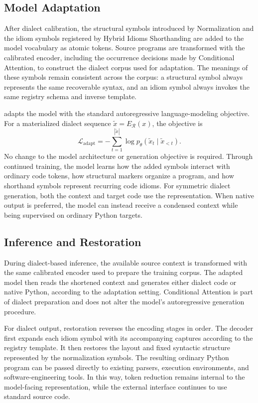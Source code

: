 \subsection{Model Adaptation}

After dialect calibration, the structural symbols introduced by Normalization and the idiom symbols registered by Hybrid Idioms Shorthanding are added to the model vocabulary as atomic tokens. Source programs are transformed with the calibrated encoder, including the occurrence decisions made by Conditional Attention, to construct the dialect corpus used for adaptation. The meanings of these symbols remain consistent across the corpus: a structural symbol always represents the same recoverable syntax, and an idiom symbol always invokes the same registry schema and inverse template.

\tool adapts the model with the standard autoregressive language-modeling objective. For a materialized dialect sequence $\widetilde{x}=E_{\mathcal{R}}(x)$, the objective is
\begin{equation}
    \mathcal{L}_{\mathrm{adapt}}
    =-\sum_{t=1}^{|\widetilde{x}|}
    \log p_{\theta}(\widetilde{x}_t\mid \widetilde{x}_{<t}).
\end{equation}
No change to the model architecture or generation objective is required. Through continued training, the model learns how the added symbols interact with ordinary code tokens, how structural markers organize a program, and how shorthand symbols represent recurring code idioms. For symmetric dialect generation, both the context and target code use the \tool representation. When native output is preferred, the model can instead receive a condensed context while being supervised on ordinary Python targets.

\subsection{Inference and Restoration}

During dialect-based inference, the available source context is transformed with the same calibrated encoder used to prepare the training corpus. The adapted model then reads the shortened context and generates either \tool dialect code or native Python, according to the adaptation setting. Conditional Attention is part of dialect preparation and does not alter the model's autoregressive generation procedure.

For dialect output, restoration reverses the encoding stages in order. The decoder first expands each idiom symbol with its accompanying captures according to the registry template. It then restores the layout and fixed syntactic structure represented by the normalization symbols. The resulting ordinary Python program can be passed directly to existing parsers, execution environments, and software-engineering tools. In this way, token reduction remains internal to the model-facing representation, while the external interface continues to use standard source code.
